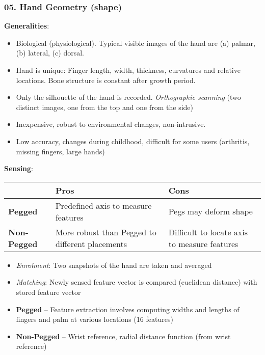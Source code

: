 \documentclass[a4paper]{article}
\begin{document}
    \subsubsection*{05. Hand Geometry (shape)}
      \textbf{Generalities}:
      \begin{itemize}
        \item Biological (physiological). Typical visible images of the hand are (a) palmar, (b) lateral, (c) dorsal.
        \item Hand is unique: Finger length, width, thickness, curvatures and relative locations. Bone structure is constant after growth period.
        \item Only the silhouette of the hand is recorded. \emph{Orthographic scanning} (two distinct images, one from the top and one from the side)
        \item Inexpensive, robust to environmental changes, non-intrusive.
        \item Low accuracy, changes during childhood, difficult for some users (arthritis, missing fingers, large hands)
      \end{itemize}

      \textbf{Sensing}:
      \begin{table}[htp]
        \centering
        \renewcommand{\arraystretch}{1.2}
        \begin{tabular}{lll}
          \toprule
          & \textbf{Pros} & \textbf{Cons}\\
          \midrule
          \textbf{Pegged} & Predefined axis to measure features & Pegs may deform shape\\
          \textbf{Non-Pegged} & More robust than Pegged to different placements & Difficult to locate axis to measure features\\
          \bottomrule
        \end{tabular}
      \end{table}
      \begin{itemize}
        \item \emph{Enrolment}: Two snapshots of the hand are taken and averaged
        \item \emph{Matching}: Newly sensed feature vector is compared (euclidean distance) with stored feature vector
        \item \textbf{Pegged} -- Feature extraction involves computing widths and lengths of fingers and palm at various locations (16 features)
        \item \textbf{Non-Pegged} -- Wrist reference, radial distance function (from wrist reference)
      \end{itemize}
\end{document}
